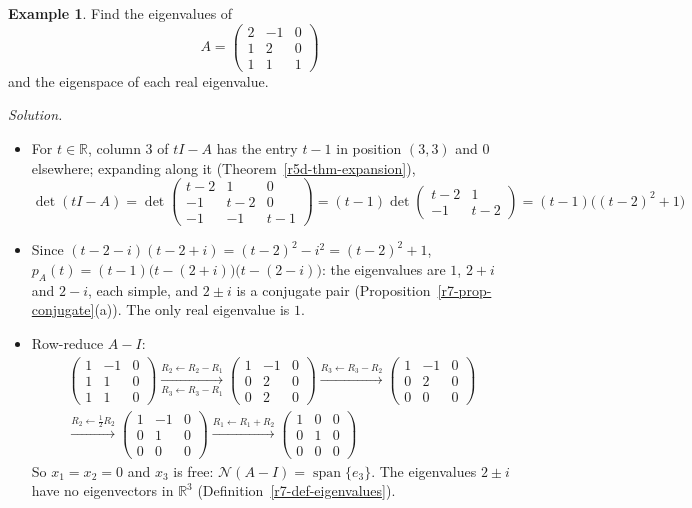 \documentclass[12pt]{article}
\newcommand{\R}{\mathbb R}
\DeclareMathOperator{\Span}{span}
\theoremstyle{definition}
\newtheorem{example}[theorem]{Example}
\begin{document}
\begin{example}\label{r7-exm-complex}
Find the eigenvalues of
\[
A=\begin{pmatrix}2&-1&0\\1&2&0\\1&1&1\end{pmatrix}
\]
and the eigenspace of each real eigenvalue.

\textit{Solution.}
\begin{itemize}
\item For \(t\in\R\), column \(3\) of \(tI-A\) has the entry \(t-1\) in position \((3,3)\) and \(0\) elsewhere; expanding
along it (Theorem~\ref{r5d-thm-expansion}),
\[
\det(tI-A)=\det\begin{pmatrix}t-2&1&0\\-1&t-2&0\\-1&-1&t-1\end{pmatrix}
=(t-1)\det\begin{pmatrix}t-2&1\\-1&t-2\end{pmatrix}=(t-1)\bigl((t-2)^2+1\bigr)
\]
\item Since \((t-2-i)(t-2+i)=(t-2)^2-i^2=(t-2)^2+1\), \(p_A(t)=(t-1)\bigl(t-(2+i)\bigr)\bigl(t-(2-i)\bigr)\): the
eigenvalues are \(1\), \(2+i\) and \(2-i\), each simple, and \(2\pm i\) is a conjugate pair
(Proposition~\ref{r7-prop-conjugate}(a)). The only real eigenvalue is \(1\).
\item Row-reduce \(A-I\):
\[
\begin{gathered}
\begin{pmatrix}1&-1&0\\1&1&0\\1&1&0\end{pmatrix}
\xrightarrow[R_3\leftarrow R_3-R_1]{R_2\leftarrow R_2-R_1}
\begin{pmatrix}1&-1&0\\0&2&0\\0&2&0\end{pmatrix}
\xrightarrow{R_3\leftarrow R_3-R_2}
\begin{pmatrix}1&-1&0\\0&2&0\\0&0&0\end{pmatrix}
\\
\xrightarrow{R_2\leftarrow\frac12R_2}
\begin{pmatrix}1&-1&0\\0&1&0\\0&0&0\end{pmatrix}
\xrightarrow{R_1\leftarrow R_1+R_2}
\begin{pmatrix}1&0&0\\0&1&0\\0&0&0\end{pmatrix}
\end{gathered}
\]
So \(x_1=x_2=0\) and \(x_3\) is free: \(\mathcal N(A-I)=\Span\{e_3\}\). The eigenvalues \(2\pm i\) have no eigenvectors in
\(\R^3\) (Definition~\ref{r7-def-eigenvalues}).
\end{itemize}
\end{example}
\end{document}
